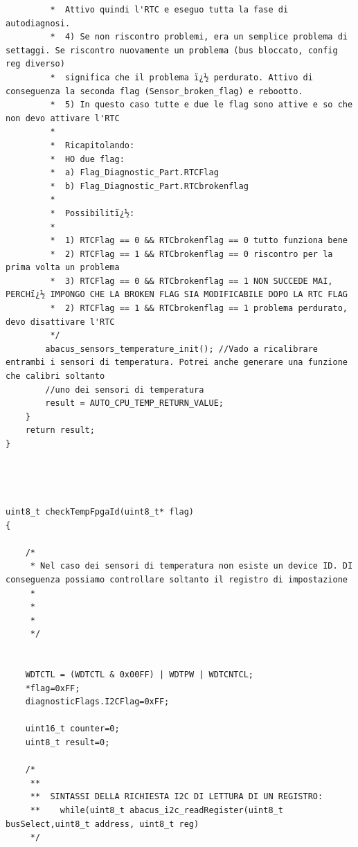 \documentclass[LaM,binding=0.6cm,oneside]{../sapthesis}
\begin{document}
\begin{lstlisting}
         *  Attivo quindi l'RTC e eseguo tutta la fase di autodiagnosi.
         *  4) Se non riscontro problemi, era un semplice problema di settaggi. Se riscontro nuovamente un problema (bus bloccato, config reg diverso)
         *  significa che il problema ï¿½ perdurato. Attivo di conseguenza la seconda flag (Sensor_broken_flag) e rebootto.
         *  5) In questo caso tutte e due le flag sono attive e so che non devo attivare l'RTC
         *
         *  Ricapitolando:
         *  HO due flag:
         *  a) Flag_Diagnostic_Part.RTCFlag
         *  b) Flag_Diagnostic_Part.RTCbrokenflag
         *
         *  Possibilitï¿½:
         *
         *  1) RTCFlag == 0 && RTCbrokenflag == 0 tutto funziona bene
         *  2) RTCFlag == 1 && RTCbrokenflag == 0 riscontro per la prima volta un problema
         *  3) RTCFlag == 0 && RTCbrokenflag == 1 NON SUCCEDE MAI, PERCHï¿½ IMPONGO CHE LA BROKEN FLAG SIA MODIFICABILE DOPO LA RTC FLAG
         *  2) RTCFlag == 1 && RTCbrokenflag == 1 problema perdurato, devo disattivare l'RTC
         */
        abacus_sensors_temperature_init(); //Vado a ricalibrare entrambi i sensori di temperatura. Potrei anche generare una funzione che calibri soltanto
        //uno dei sensori di temperatura
        result = AUTO_CPU_TEMP_RETURN_VALUE;
    }
    return result;
}




uint8_t checkTempFpgaId(uint8_t* flag)
{

    /*
     * Nel caso dei sensori di temperatura non esiste un device ID. DI conseguenza possiamo controllare soltanto il registro di impostazione
     *
     *
     *
     */


    WDTCTL = (WDTCTL & 0x00FF) | WDTPW | WDTCNTCL;
    *flag=0xFF;
    diagnosticFlags.I2CFlag=0xFF;

    uint16_t counter=0;
    uint8_t result=0;

    /*
     **
     **  SINTASSI DELLA RICHIESTA I2C DI LETTURA DI UN REGISTRO:
     **    while(uint8_t abacus_i2c_readRegister(uint8_t busSelect,uint8_t address, uint8_t reg)
     */


\end{lstlisting}
\end{document}
